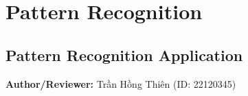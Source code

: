 \section{Pattern Recognition}

\subsection{Pattern Recognition Application}
\noindent\textbf{Author/Reviewer:} Trần Hồng Thiên (ID: 22120345)


